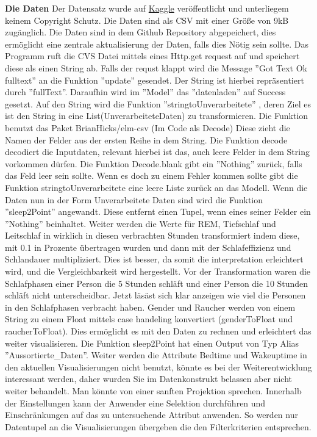 \documentclass[usegeometry=true]{scrartcl}
\begin{document}
\textbf{ Die Daten }
Der Datensatz wurde auf  \href{https://www.kaggle.com/datasets/equilibriumm/sleep-efficiency/data}{Kaggle} 
veröffentlicht und unterliegem keinem Copyright Schutz. Die Daten sind als CSV mit einer Größe von 9kB zugänglich.
Die Daten sind in dem Github Repository abgepeichert, dies ermöglicht eine zentrale aktualisierung der Daten, falls dies Nötig sein sollte.  
 Das Programm ruft die CVS Datei  mittels eines Http.get request auf und speichert diese als einen String ab.  
 Falls der requst klappt wird die Message ''Got Text Ok fulltext'' an die Funktion ''update'' gesendet.  Der String ist hierbei repräsentiert durch ''fullText''.
 Daraufhin wird im ''Model'' das  ''datenladen'' auf Success gesetzt. 
 Auf den String wird die Funktion ''stringtoUnverarbeitete'' , deren Ziel es ist den String in eine List(UnverarbeiteteDaten) zu transformieren.
 Die Funktion benutzt das  Paket BrianHicks/elm-csv (Im Code als Decode)  Diese zieht die Namen der Felder aus der ersten Reihe in dem String. Die Funktion decode decodiert die Inputdaten, relevant hierbei ist das, auch leere Felder in dem String vorkommen dürfen. Die Funktion Decode.blank gibt ein  ''Nothing'' zurück, falls das Feld leer sein sollte.
 Wenn es doch zu einem Fehler kommen sollte gibt die Funktion stringtoUnverarbeitete eine leere Liste zurück an das Modell.
 Wenn die Daten nun in der Form Unverarbeitete Daten sind wird die Funktion ''sleep2Point'' angewandt. Diese entfernt einen Tupel, wenn eines seiner Felder ein ''Nothing'' beinhaltet. Weiter werden die Werte für REM, Tiefschlaf und Leitschlaf in wirklich in diesen verbrachten Stunden transformiert indem diese, 
 mit 0.1 in Prozente übertragen wurden und dann mit der Schlafeffizienz und Schlandauer multipliziert.
 Dies ist besser, da somit die interpretation erleichtert wird, und die Vergleichbarkeit wird hergestellt. Vor der Transformation waren die Schlafphasen einer Person die 5 Stunden schläft und einer Person die 10 Stunden schläft nicht unterscheidbar. Jetzt läsäst sich klar anzeigen wie viel die Personen in den Schlafphasen verbracht haben.
 Gender und Raucher werden von einem String zu einem Float mittels case handeling konvertiert (genderToFloat und raucherToFloat). Dies ermöglicht es mit den Daten zu rechnen und erleichtert das weiter visualisieren. 
 Die Funktion sleep2Point hat einen Output von Typ Alias ''Aussortierte_Daten''.
 Weiter werden die Attribute Bedtime und Wakeuptime in den aktuellen Visualisierungen nicht benutzt, könnte es bei der Weiterentwicklung interessant werden, daher wurden Sie im Datenkonstrukt belassen aber nicht weiter behandelt. Man könnte von einer sanften Projektion sprechen.
 Innerhalb der Einstellungen kann der Anwender eine Selektion durchführen und Einschränkungen auf das zu untersuchende Attribut anwenden. So werden nur Datentupel an die Visualisierungen übergeben die den Filterkriterien entsprechen.
\end{document}
